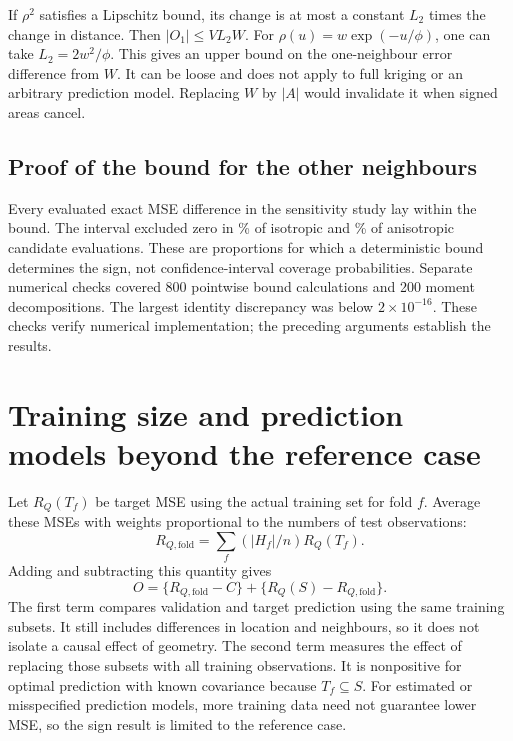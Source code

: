 \documentclass[11pt,a4paper]{article}
\begin{document}
If $\rho^2$ satisfies a Lipschitz bound, its change is at most a constant $L_2$ times the change in distance. Then $|O_1|\leq VL_2W$. For $\rho(u)=w\exp(-u/\phi)$, one can take $L_2=2w^2/\phi$. This gives an upper bound on the one-neighbour error difference from $W$. It can be loose and does not apply to full kriging or an arbitrary prediction model. Replacing $W$ by $|A|$ would invalidate it when signed areas cancel.

\subsection{Proof of the bound for the other neighbours}
\label{sec:bound}


Every evaluated exact MSE difference in the sensitivity study lay within the bound. The interval excluded zero in \CertIso\% of isotropic and \CertAniso\% of anisotropic candidate evaluations. These are proportions for which a deterministic bound determines the sign, not confidence-interval coverage probabilities. Separate numerical checks covered 800 pointwise bound calculations and 200 moment decompositions. The largest identity discrepancy was below $2\times10^{-16}$. These checks verify numerical implementation; the preceding arguments establish the results.

\section{Training size and prediction models beyond the reference case}
\label{sec:extensions}
Let $R_Q(T_f)$ be target MSE using the actual training set for fold $f$. Average these MSEs with weights proportional to the numbers of test observations:
\[
 R_{Q,\mathrm{fold}}=\sum_f(|H_f|/n)R_Q(T_f).
\]
Adding and subtracting this quantity gives
\[
O=\{R_{Q,\mathrm{fold}}-C\}+\{R_Q(S)-R_{Q,\mathrm{fold}}\}.
\]
The first term compares validation and target prediction using the same training subsets. It still includes differences in location and neighbours, so it does not isolate a causal effect of geometry. The second term measures the effect of replacing those subsets with all training observations. It is nonpositive for optimal prediction with known covariance because $T_f\subseteq S$. For estimated or misspecified prediction models, more training data need not guarantee lower MSE, so the sign result is limited to the reference case.
\end{document}
